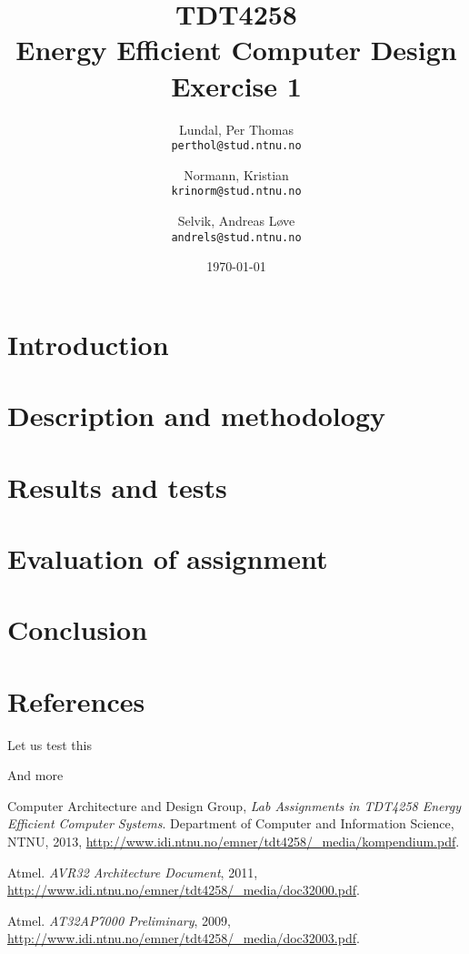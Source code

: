 \documentclass[a4paper,12pt]{article}
\title{TDT4258\\ Energy Efficient Computer Design
	\\Exercise 1}
\author{
    Lundal, Per Thomas\\
    \texttt{perthol@stud.ntnu.no}
    \and
    Normann, Kristian\\
    \texttt{krinorm@stud.ntnu.no}
    \and
    Selvik, Andreas Løve\\
    \texttt{andrels@stud.ntnu.no}
}
\date{\today}
\begin{document}
\maketitle

\clearpage
\begin{abstract}
    

\end{abstract}

\clearpage
\tableofcontents

\clearpage
\section{ Introduction}
    

\clearpage
\section{ Description and methodology}
    

\clearpage
\section{ Results and tests}
    

\clearpage
\section{ Evaluation of assignment}
    

\clearpage
\section{ Conclusion}
    

\clearpage
\section{ References}
Let us test this\cite{kompendium}

And more\cite{avr32}

\begin{thebibliography}{9}

  Computer Architecture and Design Group,
  \emph{Lab Assignments in TDT4258 Energy Efficient
Computer Systems}.
  Department of Computer and Information Science, NTNU,
  2013,
  \url{http://www.idi.ntnu.no/emner/tdt4258/\_media/kompendium.pdf}.

  Atmel.
  \emph{AVR32 Architecture Document},
  2011,
  \url{http://www.idi.ntnu.no/emner/tdt4258/\_media/doc32000.pdf}.

  Atmel.
  \emph{AT32AP7000 Preliminary},
  2009,
  \url{http://www.idi.ntnu.no/emner/tdt4258/\_media/doc32003.pdf}.


\end{thebibliography}
\end{document}
